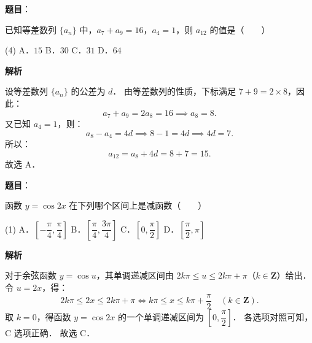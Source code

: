\begin{answer}

\textbf{题目}：

已知等差数列 $\{a_n\}$ 中，$a_7 + a_9 = 16$，$a_4 = 1$，则 $a_{12}$ 的值是\mbox{（　　）}

\begin{gkopts}(4)
\task A．$15$
\task B．$30$
\task C．$31$
\task D．$64$
\end{gkopts}

\textbf{解析}

设等差数列 $\{a_n\}$ 的公差为 $d$．
由等差数列的性质，下标满足 $7 + 9 = 2 \times 8$，因此：
\nopagebreak[4]
\[
a_7 + a_9 = 2a_8 = 16 \implies a_8 = 8.
\]
又已知 $a_4 = 1$，则：
\nopagebreak[4]
\[
a_8 - a_4 = 4d \implies 8 - 1 = 4d \implies 4d = 7.
\]
所以：
\nopagebreak[4]
\[
a_{12} = a_8 + 4d = 8 + 7 = 15.
\]
故选 A．


\end{answer}
\begin{answer}

\textbf{题目}：

函数 $y = \cos 2x$ 在下列哪个区间上是减函数\mbox{（　　）}

\begin{gkopts}(1)
\task A．$\left[-\dfrac{\pi}{4}, \dfrac{\pi}{4}\right]$
\task B．$\left[\dfrac{\pi}{4}, \dfrac{3\pi}{4}\right]$
\task C．$\left[0, \dfrac{\pi}{2}\right]$
\task D．$\left[\dfrac{\pi}{2}, \pi\right]$
\end{gkopts}

\textbf{解析}

对于余弦函数 $y = \cos u$，其单调递减区间由 $2k\pi \leqslant u \leqslant 2k\pi + \pi$（$k \in \mathbf{Z}$）给出．
令 $u = 2x$，得：
\nopagebreak[4]
\[
2k\pi \leqslant 2x \leqslant 2k\pi + \pi \iff k\pi \leqslant x \leqslant k\pi + \frac{\pi}{2} \quad (k \in \mathbf{Z}).
\]
取 $k = 0$，得函数 $y = \cos 2x$ 的一个单调递减区间为 $\left[0, \dfrac{\pi}{2}\right]$．
各选项对照可知，C 选项正确．
故选 C．


\end{answer}
